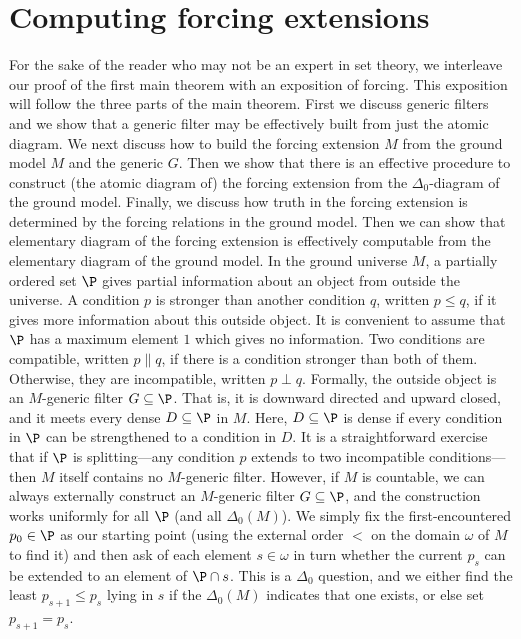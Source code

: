 \documentclass{amsart}
\begin{document}
\section{Computing forcing extensions}\label{Section.Computing-forcing-extensions}
For the sake of the reader who may not be an expert in set theory, we interleave our proof of the first main theorem with an exposition of forcing. This exposition will follow the three parts of the main theorem. First we discuss generic filters and we show that a generic filter may be effectively built from just the atomic diagram. We next discuss how to build the forcing extension $M$ from the ground model $M$ and the generic $G$. Then we show that there is an effective procedure to construct (the atomic diagram of) the forcing extension from the $\Delta_0$-diagram of the ground model. Finally, we discuss how truth in the forcing extension is determined by the forcing relations in the ground model. Then we can show that elementary diagram of the forcing extension is effectively computable from the elementary diagram of the ground model.
In the ground universe $M$, a partially ordered set $\P$ gives partial information about an object from outside the universe.
A condition $p$ is stronger than another condition $q$, written $p \le q$, if it gives more information about this outside object. It is convenient to assume that $\P$ has a maximum element $1$ which gives no information.
Two conditions are compatible, written $p \parallel q$, if there is a condition stronger than both of them. Otherwise, they are incompatible, written $p \perp q$. Formally, the outside object is an $M$-generic filter $G \subseteq \P$. That is, it
is downward directed and upward closed, and it meets every dense $D \subseteq \P$ in $M$. Here, $D \subseteq \P$ is dense if every condition in $\P$ can be strengthened to a condition in $D$. It is a straightforward exercise that if $\P$ is
splitting---any condition $p$ extends to two incompatible conditions---then $M$ itself contains no $M$-generic filter.
However, if $M$ is countable, we can always externally construct an $M$-generic filter $G \subseteq \P$,
and the construction works uniformly for all $\P$ (and all $\Delta_0(M)$).
We simply fix the first-encountered $p_0\in\P$
as our starting point (using the external order $<$ on the domain $\omega$ of $M$ to find it)
and then ask of each element $s\in\omega$ in turn whether the current $p_s$ can be extended to an
element of $\P\cap s$.
This is a $\Delta_0$ question, and we either find the least $p_{s+1}\leq p_s$
lying in $s$ if the $\Delta_0(M)$ indicates that one exists, or else set $p_{s+1}=p_s$.
\end{document}
